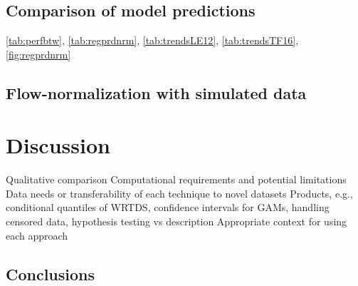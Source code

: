 \documentclass[letterpaper,12pt,oneside]{article}\usepackage[]{graphicx}\usepackage[]{color}
\begin{document}
\subsection{Comparison of model predictions}

\cref{tab:perfbtw}, \cref{tab:regprdnrm}, \cref{tab:trendsLE12}, \cref{tab:trendsTF16}, \cref{fig:regprdnrm}

\subsection{Flow-normalization with simulated data}

\section{Discussion}




\begin{outline}
\0 \noindent Qualitative comparison
\1 Computational requirements and potential limitations
\1 Data needs or transferability of each technique to novel datasets
\1 Products, e.g., conditional quantiles of \ac{WRTDS}, confidence intervals for \acp{GAM}, handling censored data, hypothesis testing vs description
\1 Appropriate context for using each approach
\end{outline}

\subsection{Conclusions}

\clearpage
\begin{singlespace}


\end{singlespace}
\clearpage

\end{document}
